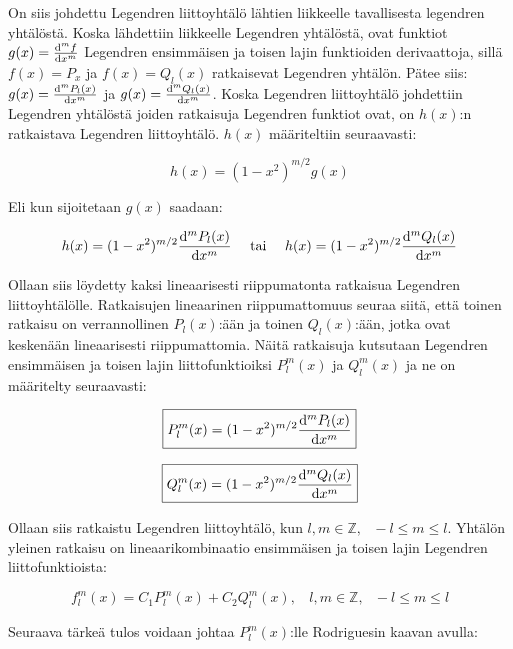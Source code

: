 \documentclass[../johdoksia.tex]{subfiles}
\begin{document}
	On siis johdettu Legendren liittoyhtälö lähtien liikkeelle tavallisesta legendren yhtälöstä. Koska lähdettiin liikkeelle Legendren yhtälöstä, ovat funktiot $g(x) = \odv{^mf}{x^m}$ Legendren ensimmäisen ja toisen lajin funktioiden derivaattoja, sillä $f(x) = P_{x}$ ja $f(x) = Q_l(x)$ ratkaisevat Legendren yhtälön. Pätee siis: $g(x) = \odv{^mP_l(x)}{x^m}$ ja $g(x) = \odv{^mQ_l(x)}{x^m}$. Koska Legendren liittoyhtälö johdettiin Legendren yhtälöstä joiden ratkaisuja Legendren funktiot ovat, on $h(x)$:n ratkaistava Legendren liittoyhtälö. $h(x)$ määriteltiin seuraavasti:
	
	\begin{equation*}
		h(x) = (1 - x^2)^{m/2}g(x)
	\end{equation*}

	Eli kun sijoitetaan $g(x)$ saadaan:
	
	\begin{equation*}
		h(x) = (1 - x^2)^{m/2}\odv{^mP_l(x)}{x^m} \ \ \ \ \text{tai} \ \ \ \ h(x) = (1 - x^2)^{m/2}\odv{^mQ_l(x)}{x^m}
	\end{equation*}

	Ollaan siis löydetty kaksi lineaarisesti riippumatonta ratkaisua Legendren liittoyhtälölle. Ratkaisujen lineaarinen riippumattomuus seuraa siitä, että toinen ratkaisu on verrannollinen $P_l(x)$:ään ja toinen $Q_l(x)$:ään, jotka ovat keskenään lineaarisesti riippumattomia. Näitä ratkaisuja kutsutaan Legendren ensimmäisen ja toisen lajin liittofunktioiksi $P_{l}^m(x)$ ja $Q_l^m(x)$ ja ne on määritelty seuraavasti:
	
	\begin{equation}
		\boxed{P_l^m(x) = (1 - x^2)^{m/2}\odv{^mP_l(x)}{x^m}}
	\end{equation}

	\begin{equation}
		\boxed{Q_l^m(x) = (1 - x^2)^{m/2}\odv{^mQ_l(x)}{x^m}}
	\end{equation}

	Ollaan siis ratkaistu Legendren liittoyhtälö, kun $l,m \in \mathbb{Z}, \ \ \ -l \leq m \leq l$. Yhtälön yleinen ratkaisu on lineaarikombinaatio ensimmäisen ja toisen lajin Legendren liittofunktioista:
	
	\begin{equation}
		\boxed{f_l^m(x) = C_1P_l^m(x) + C_2Q_l^m(x), \ \ \ \ l,m\in\mathbb{Z}, \ \ \ -l \leq m \leq l}
	\end{equation}

	Seuraava tärkeä tulos voidaan johtaa $P_l^m(x)$:lle Rodriguesin kaavan avulla:
	
\end{document}
